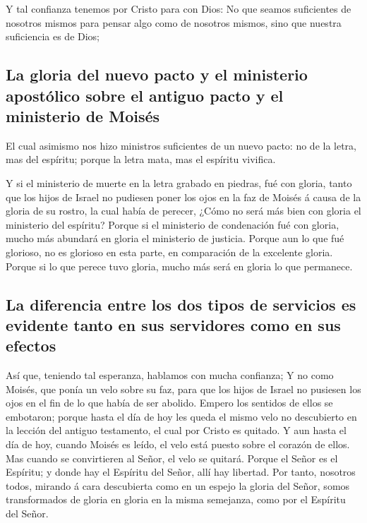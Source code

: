  Y tal confianza tenemos por Cristo para con Dios:
 No que seamos suficientes de nosotros mismos para pensar
algo como de nosotros mismos, sino que nuestra suficiencia es de Dios;

\hypertarget{la-gloria-del-nuevo-pacto-y-el-ministerio-apostuxf3lico-sobre-el-antiguo-pacto-y-el-ministerio-de-moisuxe9s}{%
\subsection{La gloria del nuevo pacto y el ministerio apostólico sobre
el antiguo pacto y el ministerio de
Moisés}\label{la-gloria-del-nuevo-pacto-y-el-ministerio-apostuxf3lico-sobre-el-antiguo-pacto-y-el-ministerio-de-moisuxe9s}}

 El cual asimismo nos hizo ministros suficientes de un nuevo
pacto: no de la letra, mas del espíritu; porque la letra mata, mas el
espíritu vivifica.

 Y si el ministerio de muerte en la letra grabado en
piedras, fué con gloria, tanto que los hijos de Israel no pudiesen poner
los ojos en la faz de Moisés á causa de la gloria de su rostro, la cual
había de perecer,  ¿Cómo no será más bien con gloria el
ministerio del espíritu?  Porque si el ministerio de
condenación fué con gloria, mucho más abundará en gloria el ministerio
de justicia.  Porque aun lo que fué glorioso, no es
glorioso en esta parte, en comparación de la excelente gloria.
 Porque si lo que perece tuvo gloria, mucho más será en
gloria lo que permanece.

\hypertarget{la-diferencia-entre-los-dos-tipos-de-servicios-es-evidente-tanto-en-sus-servidores-como-en-sus-efectos}{%
\subsection{La diferencia entre los dos tipos de servicios es evidente
tanto en sus servidores como en sus
efectos}\label{la-diferencia-entre-los-dos-tipos-de-servicios-es-evidente-tanto-en-sus-servidores-como-en-sus-efectos}}

 Así que, teniendo tal esperanza, hablamos con mucha
confianza;  Y no como Moisés, que ponía un velo sobre su
faz, para que los hijos de Israel no pusiesen los ojos en el fin de lo
que había de ser abolido.  Empero los sentidos de ellos se
embotaron; porque hasta el día de hoy les queda el mismo velo no
descubierto en la lección del antiguo testamento, el cual por Cristo es
quitado.  Y aun hasta el día de hoy, cuando Moisés es
leído, el velo está puesto sobre el corazón de ellos.  Mas
cuando se convirtieren al Señor, el velo se quitará. 
Porque el Señor es el Espíritu; y donde hay el Espíritu del Señor, allí
hay libertad.  Por tanto, nosotros todos, mirando á cara
descubierta como en un espejo la gloria del Señor, somos transformados
de gloria en gloria en la misma semejanza, como por el Espíritu del
Señor.

